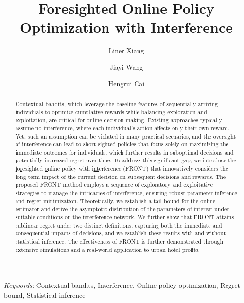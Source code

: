 \documentclass[12pt]{article}
\begin{document}
\def\spacingset#1{\renewcommand{\baselinestretch}%
{#1}\small\normalsize} \spacingset{1}
%
%
\title{\bf \LARGE Foresighted Online Policy Optimization with Interference}
\author[1]{Liner Xiang} 
\author[2]{Jiayi Wang} 
\author[1]{Hengrui Cai}
 \date{}
 \maketitle  

\baselineskip=21pt


\begin{abstract} 
Contextual bandits, which leverage the baseline features of sequentially arriving individuals to optimize cumulative rewards while balancing exploration and exploitation, are critical for online decision-making. 
Existing approaches typically assume no interference, where each individual’s action affects only their own reward. Yet, such an assumption can be violated in many practical scenarios, and the oversight of interference can lead to short-sighted policies that focus solely on maximizing the immediate outcomes for individuals, which further results in suboptimal decisions and potentially increased regret over time. To address this significant gap, we introduce the \underline{f}o\underline{r}esighted \underline{o}nline policy with i\underline{nt}erference (FRONT) that innovatively considers the long-term impact of the current decision on subsequent decisions and rewards. 
The proposed FRONT method employs a sequence of exploratory and exploitative strategies to manage the intricacies of interference, ensuring robust parameter inference and regret minimization. 
Theoretically, we establish a tail bound for the online estimator and derive the asymptotic distribution of the parameters of interest under suitable conditions on the interference network. We further show that FRONT attains sublinear regret under two distinct definitions, capturing both the immediate and consequential impacts of decisions, and we establish these results with and without statistical inference. The effectiveness of FRONT is further demonstrated through extensive simulations and a real-world application to urban hotel profits.
\end{abstract}

\noindent
{\it Keywords:} Contextual bandits, Interference, Online policy optimization, Regret bound, Statistical inference
\end{document}
